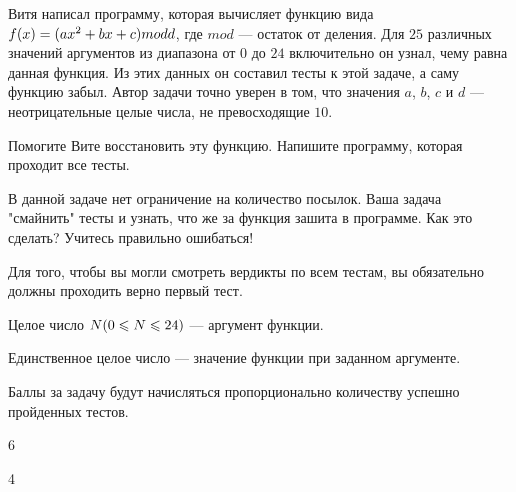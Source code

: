 
Витя написал программу, которая вычисляет функцию вида $f(x)=(ax^2+bx+c)\space mod\space d$, где $mod$ — остаток от деления. 
Для $25$ различных значений аргументов из диапазона от $0$ до $24$ включительно он узнал, чему равна данная функция. Из этих 
данных он составил тесты к этой задаче, а саму функцию забыл. Автор задачи точно уверен в том, что значения $a$, $b$, $c$ и $d$ — 
неотрицательные целые числа, не превосходящие $10$.

Помогите Вите восстановить эту функцию. Напишите программу, которая проходит все тесты.

В данной задаче нет ограничение на количество посылок. Ваша задача "смайнить" тесты и узнать, что же за функция зашита в программе. 
Как это сделать? Учитесь правильно ошибаться! 

Для того, чтобы вы могли смотреть вердикты по всем тестам, вы обязательно должны проходить верно первый тест.

Целое число $N\space(0\leq N\leq24)$  — аргумент функции.

\outputfmtSection
Единственное целое число — значение функции при заданном аргументе.

\markSection

Баллы за задачу будут начисляться пропорционально количеству успешно пройденных тестов.


\begin{myverbbox}[\small]{\vinput}
    6
\end{myverbbox}

\begin{myverbbox}[\small]{\voutput}
    4
\end{myverbbox}

